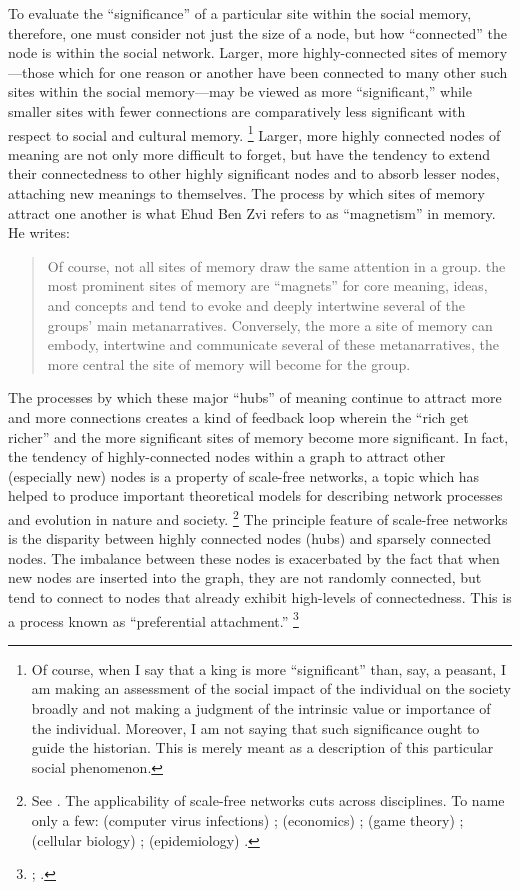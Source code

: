 To evaluate the ``significance'' of a particular site within the social memory, therefore, one must consider not just the size of a node, but how ``connected'' the node is within the social network. Larger, more highly-connected sites of memory---those which for one reason or another have been connected to many other such sites within the social memory---may be viewed as more ``significant,'' while smaller sites with fewer connections are comparatively less significant with respect to social and cultural memory.%
    \footnote{Of course, when I say that a king is more ``significant'' than, say, a peasant, I am making an assessment of the social impact of the individual on the society broadly and not making a judgment of the intrinsic value or importance of the individual. Moreover, I am not saying that such significance ought to guide the historian. This is merely meant as a description of this particular social phenomenon.}
Larger, more highly connected nodes of meaning are not only more difficult to forget, but have the tendency to extend their connectedness to other highly significant nodes and to absorb lesser nodes, attaching new meanings to themselves. The process by which sites of memory attract one another is what Ehud Ben Zvi refers to as ``magnetism'' in memory. He writes:
\begin{quote}
    Of course, not all sites of memory draw the same attention in a group. the most prominent sites of memory are ``magnets'' for core meaning, ideas, and concepts and tend to evoke and deeply intertwine several of the groups' main metanarratives. Conversely, the more a site of memory can embody, intertwine and communicate several of these metanarratives, the more central the site of memory will become for the group.\autocite[73]{benzvi_st2017}
\end{quote}
\noindent
The processes by which these major ``hubs'' of meaning continue to attract more and more connections creates a kind of feedback loop wherein the ``rich get richer'' and the more significant sites of memory become more significant. In fact, the tendency of highly-connected nodes within a graph to attract other (especially new) nodes is a property of scale-free networks, a topic which has helped to produce important theoretical models for describing network processes and evolution in nature and society.%
    \footnote{See \cite[30--33]{caldarelli2007}. The applicability of scale-free networks cuts across disciplines. To name only a few: 
        (computer virus infections) \cite{satorras-alessandro_prl2001};
        (economics) \cite{garlaschelli-etal_pysisca-a2005};
        (game theory) \cite{santos-pacheo_prl2005};
        (cellular biology) \cite{albert_jcs2005};
        (epidemiology) \cite{may-lloyd_pre2001}.}
The principle feature of scale-free networks is the disparity between highly connected nodes (hubs) and sparsely connected nodes. The imbalance between these nodes is exacerbated by the fact that when new nodes are inserted into the graph, they are not randomly connected, but tend to connect to nodes that already exhibit high-levels of connectedness. This is a process known as ``preferential attachment.''%
    \footnote{%
        \cite{barabasi-albert_science1999};
        \cite{jeong-etal_epl2003}.}

